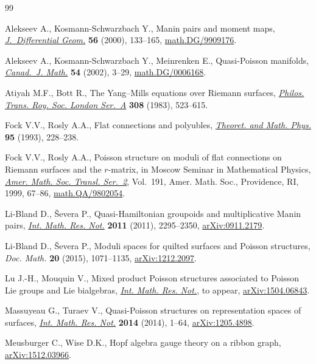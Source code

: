 \documentclass[pdftex]{sigma}
\numberwithin{equation}{section}
\begin{document}
\begin{thebibliography}{99}
\footnotesize\itemsep=0pt

Alekseev A., Kosmann-Schwarzbach Y., Manin pairs and moment maps,
 \href{https://doi.org/10.4310/jdg/1090347528}{\textit{J.~Differential Geom.}} \textbf{56} (2000), 133--165,
 \href{https://arxiv.org/abs/math.DG/9909176}{math.DG/9909176}.

Alekseev A., Kosmann-Schwarzbach Y., Meinrenken E., Quasi-{P}oisson manifolds,
 \href{https://doi.org/10.4153/CJM-2002-001-5}{\textit{Canad.~J. Math.}} \textbf{54} (2002), 3--29, \href{https://arxiv.org/abs/math.DG/0006168}{math.DG/0006168}.

Atiyah M.F., Bott R., The {Y}ang--{M}ills equations over {R}iemann surfaces,
 \href{https://doi.org/10.1098/rsta.1983.0017}{\textit{Philos. Trans. Roy. Soc. London Ser.~A}} \textbf{308} (1983),
 523--615.

Fock V.V., Rosly A.A., Flat connections and polyubles, \href{https://doi.org/10.1007/BF01017138}{\textit{Theoret. and
 Math. Phys.}} \textbf{95} (1993), 228--238.

Fock V.V., Rosly A.A., Poisson structure on moduli of f\/lat connections on
 {R}iemann surfaces and the {$r$}-mat\-rix, in Moscow {S}eminar in
 {M}athematical {P}hysics, \href{https://doi.org/10.1090/trans2/191/03}{\textit{Amer. Math. Soc. Transl. Ser.~2}}, Vol.~191,
 Amer. Math. Soc., Providence, RI, 1999, 67--86, \href{https://arxiv.org/abs/math.QA/9802054}{math.QA/9802054}.

Li-Bland D., \v{S}evera P., Quasi-{H}amiltonian groupoids and multiplicative
 {M}anin pairs, \href{https://doi.org/10.1093/imrn/rnq170}{\textit{Int. Math. Res. Not.}} \textbf{2011} (2011),
 2295--2350, \href{https://arxiv.org/abs/0911.2179}{arXiv:0911.2179}.

Li-Bland D., \v{S}evera P., Moduli spaces for quilted surfaces and {P}oisson
 structures, \textit{Doc. Math.} \textbf{20} (2015), 1071--1135,
 \href{https://arxiv.org/abs/1212.2097}{arXiv:1212.2097}.

Lu J.-H., Mouquin V., Mixed product Poisson structures associated to {P}oisson
 {L}ie groups and {L}ie bialgebras, \href{https://doi.org/10.1093/imrn/rnw189}{\textit{Int. Math. Res. Not.}}, {t}o appear,
 \href{https://arxiv.org/abs/1504.06843}{arXiv:1504.06843}.

Massuyeau G., Turaev V., Quasi-{P}oisson structures on representation spaces of
 surfaces, \href{https://doi.org/10.1093/imrn/rns215}{\textit{Int. Math. Res. Not.}} \textbf{2014} (2014), 1--64,
 \href{https://arxiv.org/abs/1205.4898}{arXiv:1205.4898}.

Meusburger C., Wise D.K., Hopf algebra gauge theory on a ribbon graph,
 \href{https://arxiv.org/abs/1512.03966}{arXiv:1512.03966}.

\end{thebibliography}\LastPageEnding
\end{document}
